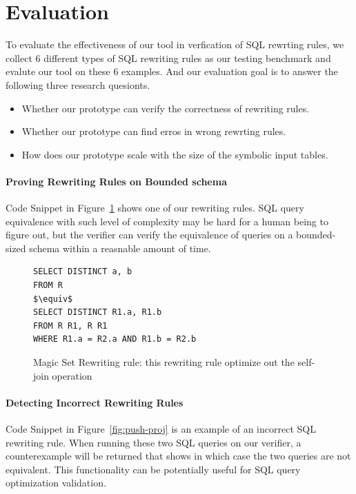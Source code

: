 \section{Evaluation}
\label{sec:eval}
To evaluate the effectiveness of our tool in verfication of SQL rewrting rules, we collect 6 different types of SQL rewriting rules as our testing benchmark and evalute our tool on these 6 examples. And our evaluation goal is to answer the following three research quesionts.
\begin{itemize}\itemsep0pt
\item Whether our prototype can verify the correctness of rewriting rules.
\item Whether our prototype can find erros in wrong rewrting rules.
\item How does our prototype scale with the size of the symbolic input tables.
\end{itemize}

\paragraph{Proving Rewriting Rules on Bounded schema}
Code Snippet in Figure~\ref{fig:magic} shows one of our rewriting rules. 
SQL query equivalence with such level of complexity may be hard for a human being to 
figure out, but the verifier can verify the equivalence of queries on a bounded-sized 
schema within a reasnable amount of time.

\begin{figure}[!htb]
\begin{lstlisting}[style=sql,xleftmargin=.3\textwidth,mathescape=true]
SELECT DISTINCT a, b
FROM R
$\equiv$
SELECT DISTINCT R1.a, R1.b
FROM R R1, R R1
WHERE R1.a = R2.a AND R1.b = R2.b
\end{lstlisting}
\caption{Magic Set Rewriting rule: this rewriting rule optimize out the self-join operation}
\label{fig:magic}
\end{figure}

\paragraph{Detecting Incorrect Rewriting Rules}
Code Snippet in Figure~\ref{fig:push-proj} is an example 
of an incorrect SQL rewriting rule.
When running these two SQL queries on our verifier, a counterexample will be returned that
shows in which case the two queries are not equivalent.
This functionality can be potentially useful for SQL query optimization validation.

